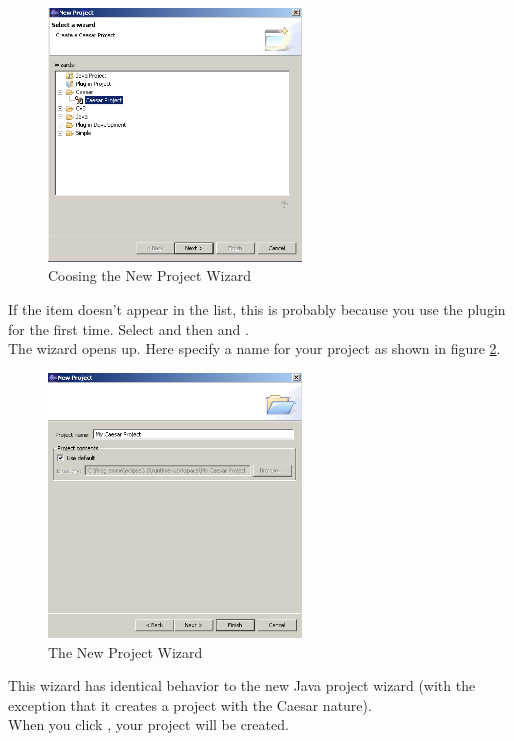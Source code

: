 \begin{figure}[htbp]
	\centering
		\includegraphics[width=0.60\textwidth]{images/project_wizard.png}
	\caption{Coosing the New Project Wizard}
	\label{fig:project_wizard}
\end{figure}

If the item doesn't appear in the list, this is probably because you use the plugin for the first time. Select  and then  and .\\
The wizard opens up. Here specify a name for your project as shown in figure \ref{fig:project_wizard2}.

\begin{figure}[htbp]
	\centering
		\includegraphics[width=0.60\textwidth]{images/project_wizard2.png}
	\caption{The New Project Wizard}
	\label{fig:project_wizard2}
\end{figure}

This wizard has identical behavior to the new Java project wizard (with the exception that
it creates a project with the Caesar nature).\\
When you click , your project will be created.